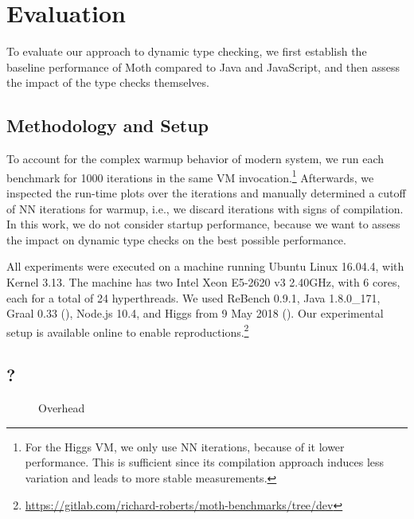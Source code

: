 
\section{Evaluation}
\label{sec:evaluation}


To evaluate our approach to dynamic type checking,
we first establish the baseline performance of Moth
compared to Java and JavaScript,
and then assess the impact of the type checks themselves.

\subsection{Methodology and Setup}

To account for the complex warmup behavior
of modern system\citep{Barrett:2017:VMW},
we run each benchmark for 1000 iterations in the same
VM invocation.\footnote{
For the Higgs VM, we only use NN iterations,
because of it lower performance.
This is sufficient since its compilation approach induces less variation
and leads to more stable measurements.}
Afterwards, we inspected the run-time plots over the iterations
and manually determined a cutoff of NN iterations for warmup,
i.e., we discard iterations with signs of compilation.
In this work, we do not consider startup performance,
because we want to assess the impact on dynamic type checks
on the best possible performance.

All experiments were executed on a machine running Ubuntu Linux 16.04.4,
with Kernel 3.13.
The machine has two Intel Xeon E5-2620 v3 2.40GHz,
with 6 cores, each for a total of 24 hyperthreads.
We used ReBench 0.9.1, Java 1.8.0\_171, Graal 0.33 (),
Node.js 10.4, and Higgs from 9 May 2018 ().
Our experimental setup is available online to enable reproductions.\footnote{
\url{https://gitlab.com/richard-roberts/moth-benchmarks/tree/dev}}


\subsection{\AWFY?}
\label{sec:baseline-perf}


\begin{figure}
	\AwfyBaseline{}
	\caption{Overhead}
	\label{fig:awfy-baseline}
\end{figure}

